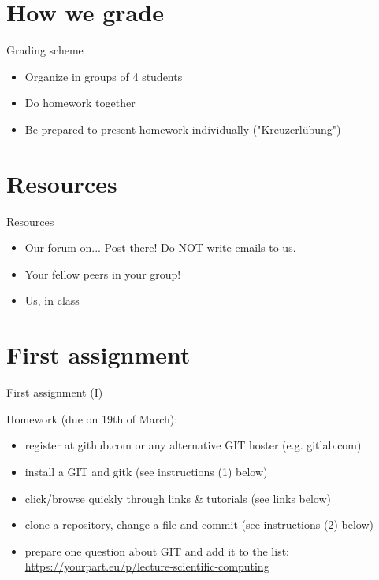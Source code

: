 \documentclass[10pt,color=usenames,dvipsnames]{beamer}
\begin{document}
\section{How we grade}

\begin{frame}{Grading scheme}

	\begin{itemize}
		\item Organize in groups of 4 students	
		\item Do homework together
		\item Be prepared to present homework individually ("Kreuzerlübung")		
	\end{itemize}

\end{frame}

\section{Resources}

\begin{frame}{Resources}
	
	\begin{itemize}
		\item Our forum on... Post there! Do NOT write emails to us.
		\item Your fellow peers in your group!
		\item Us, in class
	\end{itemize}


\end{frame}

\section{First assignment}

\begin{frame}{First assignment (I)}


Homework (due on 19th of March):

\begin{itemize}
	
	\item register at github.com or any alternative GIT hoster (e.g. gitlab.com)
	\item install a GIT and gitk (see instructions (1) below)
	\item click/browse quickly through links \& tutorials (see links below)
	\item  clone a repository, change a file and commit (see instructions (2) below)
	\item prepare one question about GIT and add it to the list: \href{https://yourpart.eu/p/lecture-scientific-computing}{https://yourpart.eu/p/lecture-scientific-computing}

\end{itemize}


\end{frame}
\end{document}
